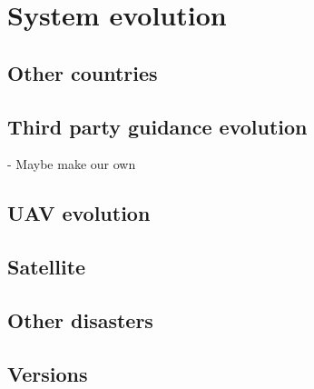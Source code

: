 \chapter{System evolution}
\label{ch:evolution}

\section{Other countries}

\section{Third party guidance evolution}
	- Maybe make our own

\section{UAV evolution}

\section{Satellite}

\section{Other disasters}

\section{Versions}



